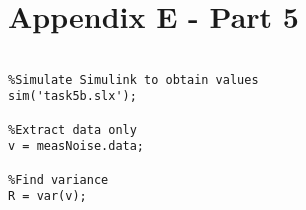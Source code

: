 \section{Appendix E - Part 5}

\begin{lstlisting}[frame=single, label={lst:5b_var}, caption={MATLAB code to find the estimate of the variance of the measurement noise},captionpos=b]

%Simulate Simulink to obtain values
sim('task5b.slx');

%Extract data only
v = measNoise.data;

%Find variance
R = var(v);

\end{lstlisting}

